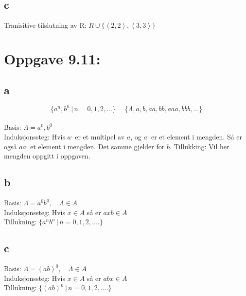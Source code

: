 \documentclass[a4paper, norsk, 10pt]{article}
\begin{document}
\begin{flushleft}
\subsection*{c}
Tranisitive tilslutning av R: \quad $R \cup \{\left<2,2\right>, \left<3,3\right> \}$



\section*{Oppgave 9.11:}
\subsection*{a}
\[\{a^{n}, b^{n} \, | \,n = 0,1,2,...\} = \{\Lambda, a, b, aa, bb, aaa, bbb, ... \}\]
\\
Basis: $\Lambda =  a^{0}, b^{0}$ \\
Induksjonssteg: Hvis $a^{,}$ er et multipel av $a$, og $a^{,}$ er et element i mengden. Så er også $aa^{,}$ et element i mengden. Det samme gjelder for $b$.
Tillukking: Vil her mengden oppgitt i oppgaven.


\subsection*{b}
Basis: $\Lambda = a^{0}b^{0}, \quad \Lambda \in A$ \\
Induksjonssteg: Hvis $x \in A$ så er $axb \in A$ \\
Tillukning: $\{a^{n}b^{n} \, | \, n = 0, 1, 2, ....\}$

\subsection*{c}
Basis: $\Lambda = (ab)^{0}, \quad \Lambda \in A$ \\
Induksjonssteg: Hvis $x \in A$ så er $abx \in A$ \\
Tillukning: $\{(ab)^{n} \, | \, n = 0, 1, 2, ....\}$

\end{flushleft}
\end{document}
